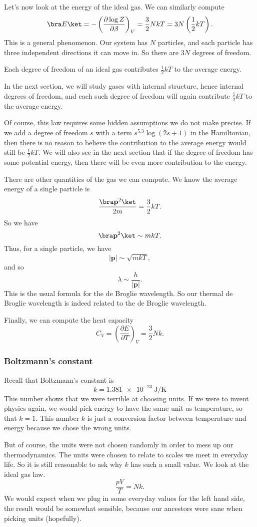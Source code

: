 \documentclass[a4paper]{article}
\begin{document}
Let's now look at the energy of the ideal gas. We can similarly compute
\[
  \bra E\ket = - \left(\frac{\partial \log Z}{\partial \beta}\right)_V = \frac{3}{2} NkT = 3N \left(\frac{1}{2} kT\right).
\]
This is a general phenomenon. Our system has $N$ particles, and each particle has three independent directions it can move in. So there are $3N$ degrees of freedom.
\begin{law}
  Each degree of freedom of an ideal gas contributes $\frac{1}{2}kT$ to the average energy.
\end{law}
In the next section, we will study gases with internal structure, hence internal degrees of freedom, and each such degree of freedom will again contribute $\frac{1}{2}kT$ to the average energy.

Of course, this law requires some hidden assumptions we do not make precise. If we add a degree of freedom $s$ with a term $s^{5.3} \log (2s + 1)$ in the Hamiltonian, then there is no reason to believe the contribution to the average energy would still be $\frac{1}{2} kT$. We will also see in the next section that if the degree of freedom has some potential energy, then there will be even more contribution to the energy.

There are other quantities of the gas we can compute. We know the average energy of a single particle is
\[
  \frac{\bra \mathbf{p}^2\ket}{2m} = \frac{3}{2} kT.
\]
So we have
\[
  \bra \mathbf{p}^2 \ket \sim mkT.
\]
Thus, for a single particle, we have
\[
  |\mathbf{p}| \sim \sqrt{mkT},
\]
and so
\[
  \lambda \sim \frac{h}{|\mathbf{p}|}.
\]
This is the usual formula for the de Broglie wavelength. So our thermal de Broglie wavelength is indeed related to the de Broglie wavelength.

Finally, we can compute the heat capacity
\[
  C_V = \left(\frac{\partial E}{\partial T}\right)_V = \frac{3}{2}Nk.
\]
\subsubsection*{Boltzmann's constant}
Recall that Boltzmann's constant is
\[
  k = \SI{1.381e-23}{\joule\per\kelvin}
\]
This number shows that we were terrible at choosing units. If we were to invent physics again, we would pick energy to have the same unit as temperature, so that $k = 1$. This number $k$ is just a conversion factor between temperature and energy because we chose the wrong units.

But of course, the units were not chosen randomly in order to mess up our thermodynamics. The units were chosen to relate to scales we meet in everyday life. So it is still reasonable to ask why $k$ has such a small value. We look at the ideal gas law.
\[
  \frac{pV}{T} = Nk.
\]
We would expect when we plug in some everyday values for the left hand side, the result would be somewhat sensible, because our ancestors were sane when picking units (hopefully).
\end{document}

